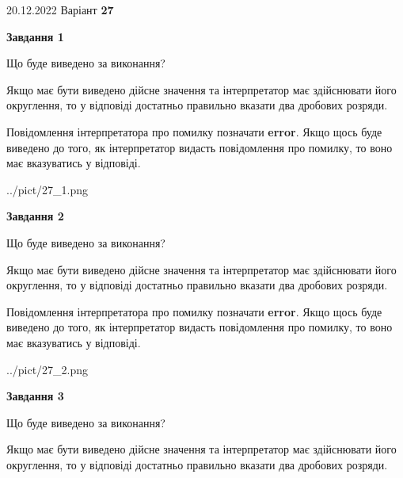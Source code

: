 \documentclass[12pt, ukrainian]{article}
\begin{document}
{20.12.2022 Варіант \No \textbf { 27 }\par}
{
\begin {Large}

{\begin {center}\textbf{Завдання 1}\end {center}}\par
Що буде виведено за виконання? \par

Якщо має бути виведено дійсне значення та інтерпретатор має здійснювати його округлення, 
то у відповіді достатньо правильно вказати два дробових розряди.

Повідомлення інтерпретатора про помилку позначати \textbf{error}.
Якщо щось буде виведено до того, як інтерпретатор видасть повідомлення про помилку, 
то воно має вказуватись у відповіді. \par

\begin{center}
	{../pict/27_1.png}
\end{center}
\newpage

{\begin {center}\textbf{Завдання 2}\end {center}}\par
Що буде виведено за виконання? \par

Якщо має бути виведено дійсне значення та інтерпретатор має здійснювати його округлення, 
то у відповіді достатньо правильно вказати два дробових розряди.

Повідомлення інтерпретатора про помилку позначати \textbf{error}.
Якщо щось буде виведено до того, як інтерпретатор видасть повідомлення про помилку, 
то воно має вказуватись у відповіді. \par

\begin{center}
	{../pict/27_2.png}
\end{center}
\newpage

{\begin {center}\textbf{Завдання 3}\end {center}}\par
Що буде виведено за виконання? \par

Якщо має бути виведено дійсне значення та інтерпретатор має здійснювати його округлення, 
то у відповіді достатньо правильно вказати два дробових розряди.


\end{Large}}
\end{document}
